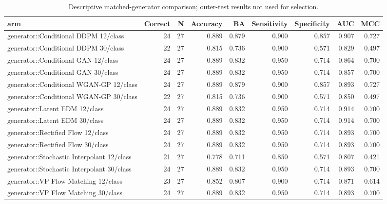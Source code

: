 \begin{table}[t]
\centering
\caption{Descriptive matched-generator comparison; outer-test results not used for selection.}
\footnotesize
\begin{tabular}{lrrrrrrrr}
\toprule
arm & Correct & N & Accuracy & BA & Sensitivity & Specificity & AUC & MCC \\
\midrule
generator::Conditional DDPM 12/class & 24 & 27 & 0.889 & 0.879 & 0.900 & 0.857 & 0.907 & 0.727 \\
generator::Conditional DDPM 30/class & 22 & 27 & 0.815 & 0.736 & 0.900 & 0.571 & 0.829 & 0.497 \\
generator::Conditional GAN 12/class & 24 & 27 & 0.889 & 0.832 & 0.950 & 0.714 & 0.864 & 0.700 \\
generator::Conditional GAN 30/class & 24 & 27 & 0.889 & 0.832 & 0.950 & 0.714 & 0.857 & 0.700 \\
generator::Conditional WGAN-GP 12/class & 24 & 27 & 0.889 & 0.879 & 0.900 & 0.857 & 0.893 & 0.727 \\
generator::Conditional WGAN-GP 30/class & 22 & 27 & 0.815 & 0.736 & 0.900 & 0.571 & 0.850 & 0.497 \\
generator::Latent EDM 12/class & 24 & 27 & 0.889 & 0.832 & 0.950 & 0.714 & 0.914 & 0.700 \\
generator::Latent EDM 30/class & 24 & 27 & 0.889 & 0.832 & 0.950 & 0.714 & 0.914 & 0.700 \\
generator::Rectified Flow 12/class & 24 & 27 & 0.889 & 0.832 & 0.950 & 0.714 & 0.893 & 0.700 \\
generator::Rectified Flow 30/class & 24 & 27 & 0.889 & 0.832 & 0.950 & 0.714 & 0.893 & 0.700 \\
generator::Stochastic Interpolant 12/class & 21 & 27 & 0.778 & 0.711 & 0.850 & 0.571 & 0.807 & 0.421 \\
generator::Stochastic Interpolant 30/class & 24 & 27 & 0.889 & 0.832 & 0.950 & 0.714 & 0.893 & 0.700 \\
generator::VP Flow Matching 12/class & 23 & 27 & 0.852 & 0.807 & 0.900 & 0.714 & 0.871 & 0.614 \\
generator::VP Flow Matching 30/class & 24 & 27 & 0.889 & 0.832 & 0.950 & 0.714 & 0.893 & 0.700 \\
\bottomrule
\end{tabular}
\end{table}
